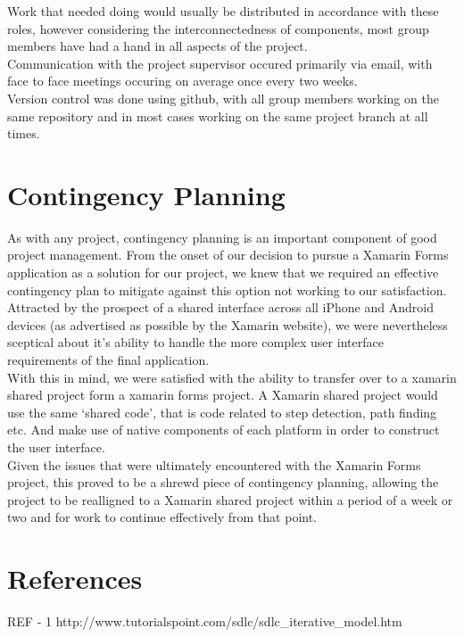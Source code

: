 \documentclass[main.tex]{subfiles}
\begin{document}
Work that needed doing would usually be distributed in accordance with these roles, however considering the interconnectedness of components, most group members have had a hand in all aspects of the project. \\

Communication with the project supervisor occured primarily via email, with face to face meetings occuring on average once every two weeks. \\

Version control was done using github, with all group members working on the same repository and in most cases working on the same project branch at all times.\\

\section{Contingency Planning}

As with any project, contingency planning is an important component of good project management. From the onset of our decision to pursue a Xamarin Forms application as a solution for our project, we knew that we required an effective contingency plan to mitigate against this option not working to our satisfaction. Attracted by the prospect of a shared interface across all iPhone and Android devices (as advertised as possible by the Xamarin website), we were nevertheless sceptical about it's ability to handle the more complex user interface requirements of the final application.\\

With this in mind, we were satisfied with the ability to transfer over to a xamarin shared project form a xamarin forms project. A Xamarin shared project would use the same `shared code', that is code related to step detection, path finding etc. And make use of native components of each platform in order to construct the user interface.\\

Given the issues that were ultimately encountered with the Xamarin Forms project, this proved to be a shrewd piece of contingency planning, allowing the project to be realligned to a Xamarin shared project within a period of a week or two and for work to continue effectively from that point.\\

\section{References}

REF - 1 http://www.tutorialspoint.com/sdlc/sdlc\_iterative\_model.htm
\end{document}

